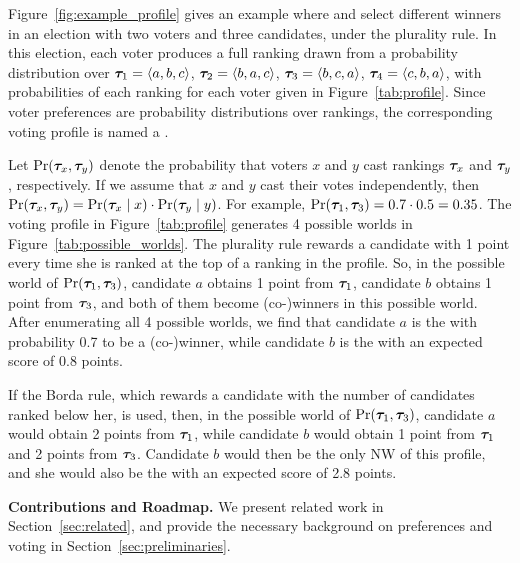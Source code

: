 \begin{example}\label{ex:1}
Figure~\ref{fig:example_profile} gives an example where \mew and \mpw select different winners in an election with two voters and three candidates, under the plurality rule. 
In this election, each voter produces a full ranking drawn from a probability distribution over  $\bm{\tau}_1 = \langle a, b, c \rangle$, $\bm{\tau}_2 = \langle b, a, c \rangle$,  $\bm{\tau}_3 = \langle b, c, a \rangle$, $\bm{\tau}_4 = \langle c, b, a \rangle$, with probabilities of each ranking for each voter given in Figure~\ref{tab:profile}.
Since voter preferences are probability distributions over rankings, the corresponding voting profile is named a .

Let $\Pr(\bm{\tau}_x, \bm{\tau}_y)$ denote the probability that voters $x$ and $y$ cast rankings $\bm{\tau}_x$ and $\bm{\tau}_y$, respectively.  If we assume that $x$ and $y$ cast their votes independently, then $\Pr(\bm{\tau}_x, \bm{\tau}_y) = \Pr(\bm{\tau}_x \mid x) \cdot \Pr(\bm{\tau}_y \mid y)$. For example, $\Pr (\bm{\tau}_1, \bm{\tau}_3) = 0.7 \cdot 0.5 = 0.35$.
The voting profile in Figure~\ref{tab:profile} generates 4 possible worlds in Figure~\ref{tab:possible_worlds}.
The plurality rule rewards a candidate with 1 point every time she is ranked at the top of a ranking in the profile.
So, in the possible world of $\Pr (\bm{\tau}_1, \bm{\tau}_3)$, candidate $a$ obtains 1 point from $\bm{\tau}_1$, candidate $b$ obtains 1 point from $\bm{\tau}_3$, and both of them become (co-)winners in this possible world.
After enumerating all 4 possible worlds, we find that candidate $a$ is the \mpw with probability 0.7 to be a (co-)winner, while candidate $b$ is the \mew with an expected score of 0.8 points.

If the Borda rule, which rewards a candidate with the number of candidates ranked below her, is used, then, in the possible world of $\Pr (\bm{\tau}_1, \bm{\tau}_3)$, candidate $a$ would obtain 2 points from $\bm{\tau}_1$, while candidate $b$ would obtain 1 point from $\bm{\tau}_1$ and 2 points from $\bm{\tau}_3$. Candidate $b$ would then be the only NW of this profile, and she would also be the \mew with an expected score of 2.8 points.
\end{example}

{\bf Contributions and Roadmap.} We present related work in Section~\ref{sec:related}, and provide the necessary background on preferences and voting in Section~\ref{sec:preliminaries}.  

